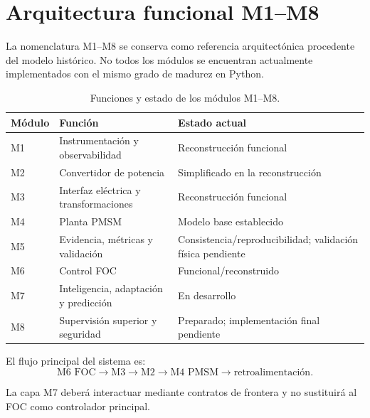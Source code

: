 \section{Arquitectura funcional M1--M8}

La nomenclatura M1--M8 se conserva como referencia arquitectónica procedente del modelo histórico. No todos los módulos se encuentran actualmente implementados con el mismo grado de madurez en Python.

\begin{table}[H]
\centering
\caption{Funciones y estado de los módulos M1--M8.}
\begin{tabular}{p{}p{}p{}}
\toprule
Módulo & Función & Estado actual \\
\midrule
M1 & Instrumentación y observabilidad & Reconstrucción funcional \\
M2 & Convertidor de potencia & Simplificado en la reconstrucción \\
M3 & Interfaz eléctrica y transformaciones & Reconstrucción funcional \\
M4 & Planta PMSM & Modelo base establecido \\
M5 & Evidencia, métricas y validación & Consistencia/reproducibilidad; validación física pendiente \\
M6 & Control FOC & Funcional/reconstruido \\
M7 & Inteligencia, adaptación y predicción & En desarrollo \\
M8 & Supervisión superior y seguridad & Preparado; implementación final pendiente \\
\bottomrule
\end{tabular}
\end{table}

El flujo principal del sistema es:
\begin{equation}
\text{M6 FOC}\rightarrow\text{M3}\rightarrow\text{M2}\rightarrow\text{M4 PMSM}\rightarrow\text{retroalimentación}.
\end{equation}

La capa M7 deberá interactuar mediante contratos de frontera y no sustituirá al FOC como controlador principal.
